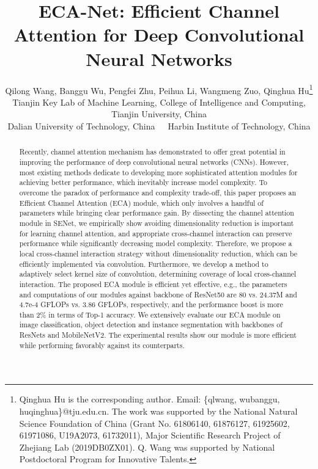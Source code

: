\documentclass[10pt,twocolumn,letterpaper]{article}
\begin{document}
\title{ECA-Net: Efficient Channel Attention for Deep Convolutional Neural Networks}

\author{Qilong Wang, Banggu Wu, Pengfei Zhu, Peihua Li, Wangmeng Zuo, Qinghua Hu\thanks{Qinghua Hu is the corresponding author. 
		\newline Email: \{qlwang, wubanggu, huqinghua\}@tju.edu.cn.	 The work was supported by the National Natural Science Foundation of China (Grant No. 61806140, 61876127, 61925602, 61971086, U19A2073, 61732011), Major Scientific Research Project of Zhejiang Lab (2019DB0ZX01). Q. Wang was supported by National Postdoctoral Program for Innovative Talents.} \\ 
	 Tianjin Key Lab of Machine Learning, College of Intelligence and Computing, Tianjin University, China\\
	 Dalian University of Technology, China \,\,\,\,\,  Harbin Institute of Technology, China\\	
}

\maketitle
\thispagestyle{empty}

\begin{abstract}
	Recently, channel attention mechanism has demonstrated to offer great potential in improving the performance of deep convolutional neural networks (CNNs). However, most existing methods dedicate to developing more sophisticated attention modules for achieving better performance, which inevitably increase model complexity. To overcome the paradox of performance and complexity trade-off, this paper proposes an Efficient Channel Attention (ECA) module, which only involves a handful of parameters while bringing clear performance gain. By dissecting the channel attention module in SENet, we empirically show avoiding dimensionality reduction is important for learning channel attention, and appropriate cross-channel interaction can preserve performance while significantly decreasing model complexity. Therefore, we propose a local cross-channel interaction strategy without dimensionality reduction, which can be efficiently implemented via  convolution. Furthermore, we develop a method to adaptively select kernel size of  convolution, determining coverage of local cross-channel interaction. The proposed ECA module is efficient yet effective, e.g., the parameters and computations of our modules against backbone of ResNet50 are 80 vs. 24.37M and 4.7e-4 GFLOPs vs. 3.86 GFLOPs, respectively, and the performance boost is more than 2\% in terms of Top-1 accuracy. We extensively evaluate our ECA module on image classification, object detection and instance segmentation with backbones of ResNets and MobileNetV2. The experimental results show our module is more efficient while performing favorably against its counterparts.
\end{abstract}
\end{document}
